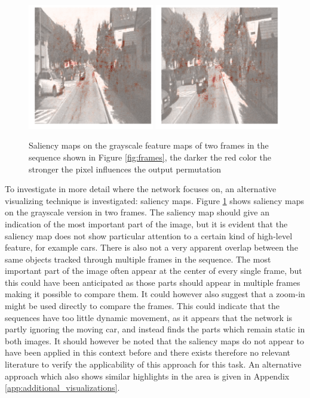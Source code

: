 \begin{figure}[t]
\centering
\includegraphics[width=0.49\textwidth]{images/saliency_1-0.png}
\includegraphics[width=0.49\textwidth]{images/saliency_1-1.png}
\caption{Saliency maps on the grayscale feature maps of two frames in the sequence shown in Figure \ref{fig:frames}, the darker the red color the stronger the pixel influences the output permutation}
\label{fig:saliency}
\end{figure}

To investigate in more detail where the network focuses on, an alternative visualizing technique is investigated: saliency maps. Figure \ref{fig:saliency} shows saliency maps on the grayscale version in two frames. The saliency map should give an indication of the most important part of the image, but it is evident that the saliency map does not show particular attention to a certain kind of high-level feature, for example cars. There is also not a very apparent overlap between the same objects tracked through multiple frames in the sequence. The most important part of the image often appear at the center of every single frame, but this could have been anticipated as those parts should appear in multiple frames making it possible to compare them. It could however also suggest that a zoom-in might be used directly to compare the frames. This could indicate that the sequences have too little dynamic movement, as it appears that the network is partly ignoring the moving car, and instead finds the parts which remain static in both images. It should however be noted that the saliency maps do not appear to have been applied in this context before and there exists therefore no relevant literature to verify the applicability of this approach for this task. An alternative approach which also shows similar highlights in the area is given in Appendix \ref{app:additional_visualizations}.

